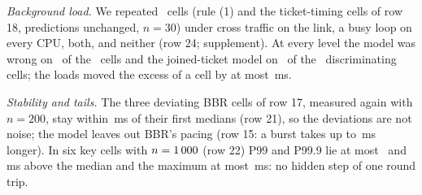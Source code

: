 \documentclass[sigconf,9pt,nonacm]{acmart}
\newcommand{\ms}{\,ms\xspace}
\begin{document}
\emph{Background load.} We repeated \GseventeenCells\ cells (rule (1) and the ticket-timing cells of row 18, predictions unchanged, $n=30$) under cross traffic on the link, a busy loop on every CPU, both, and neither (row 24; supplement). At every level the model was wrong on \GseventeenWrongMax\ of the \GseventeenCells\ cells and the joined-ticket model on \GseventeenJoinedMin\ of the \GseventeenDisc\ discriminating cells; the loads moved the excess of a cell by at most \GseventeenShiftMax\ms.

\emph{Stability and tails.} The three deviating BBR cells of row 17, measured again with $n=200$, stay within \GtwentyMaxDiff\ms of their first medians (row 21), so the deviations are not noise; the model leaves out BBR's pacing (row 15: a burst takes up to \GelBbrBurstMax\ms longer). In six key cells with $n=1\,000$ (row 22) P99 and P99.9 lie at most \GtwentyoneMaxP\ and \GtwentyoneMaxPt\ms above the median and the maximum at most \GtwentyoneMaxMx\ms: no hidden step of one round trip.
\end{document}
